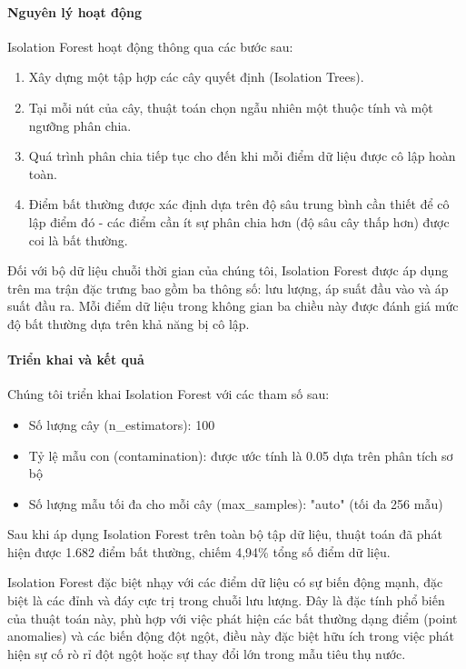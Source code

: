 \paragraph{Nguyên lý hoạt động}
Isolation Forest hoạt động thông qua các bước sau:
\begin{enumerate}
    \item Xây dựng một tập hợp các cây quyết định (Isolation Trees).
    \item Tại mỗi nút của cây, thuật toán chọn ngẫu nhiên một thuộc tính và một ngưỡng phân chia.
    \item Quá trình phân chia tiếp tục cho đến khi mỗi điểm dữ liệu được cô lập hoàn toàn.
    \item Điểm bất thường được xác định dựa trên độ sâu trung bình cần thiết để cô lập điểm đó - các điểm cần ít sự phân chia hơn (độ sâu cây thấp hơn) được coi là bất thường.
\end{enumerate}

Đối với bộ dữ liệu chuỗi thời gian của chúng tôi, Isolation Forest được áp dụng trên ma trận đặc trưng bao gồm ba thông số: lưu lượng, áp suất đầu vào và áp suất đầu ra. Mỗi điểm dữ liệu trong không gian ba chiều này được đánh giá mức độ bất thường dựa trên khả năng bị cô lập.

\paragraph{Triển khai và kết quả}
Chúng tôi triển khai Isolation Forest với các tham số sau:
\begin{itemize}
    \item Số lượng cây (n\_estimators): 100
    \item Tỷ lệ mẫu con (contamination): được ước tính là 0.05 dựa trên phân tích sơ bộ
    \item Số lượng mẫu tối đa cho mỗi cây (max\_samples): "auto" (tối đa 256 mẫu)
\end{itemize}

Sau khi áp dụng Isolation Forest trên toàn bộ tập dữ liệu, thuật toán đã phát hiện được 1.682 điểm bất thường, chiếm 4,94\% tổng số điểm dữ liệu.

Isolation Forest đặc biệt nhạy với các điểm dữ liệu có sự biến động mạnh, đặc biệt là các đỉnh và đáy cực trị trong chuỗi lưu lượng. Đây là đặc tính phổ biến của thuật toán này, phù hợp với việc phát hiện các bất thường dạng điểm (point anomalies) và các biến động đột ngột, điều này đặc biệt hữu ích trong việc phát hiện sự cố rò rỉ đột ngột hoặc sự thay đổi lớn trong mẫu tiêu thụ nước.

